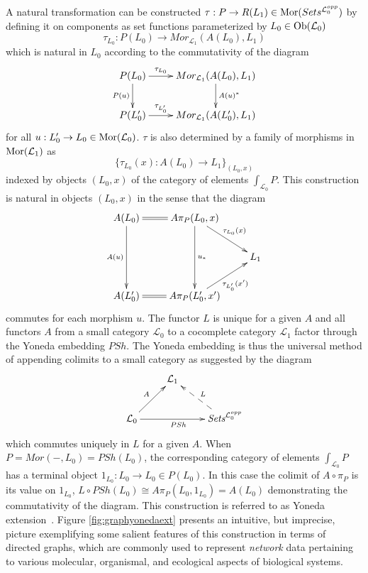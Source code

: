 \documentclass[aps,twocolumn]{revtex4-1}
\begin{document}
\iftoggle{thmsty}{
\begin{proof}
\label{proof-cocompletion-adjunction}
}{}
A natural transformation can be constructed $\tau : P \rightarrow R(L_1) \in \mathop{\rm Mor}\nolimits(Sets^{\mathcal{L}_0^{opp}})$ by defining it on components as set functions parameterized by $L_0 \in \mathop{\rm Ob}\nolimits(\mathcal{L}_0)$
$$
\tau_{L_0} : P(L_0) \rightarrow Mor_{\mathcal{L}_1}(A(L_0),L_1)
$$
which is natural in $L_0$ according to the commutativity of the diagram
$$
\xymatrix{
P(L_0) \ar[r]^-{\tau_{L_0}} \ar[d]_{P(u)} & Mor_{\mathcal{L}_1}(A(L_0),L_1) \ar[d]^{A(u)^*} \\
P(L'_0) \ar[r]^-{\tau_{L'_0}} & Mor_{\mathcal{L}_1}(A(L'_0),L_1) }
$$
for all $u:L'_0 \rightarrow L_0 \in \mathop{\rm Mor}\nolimits(\mathcal{L}_0)$. $\tau$ is also determined by a family of morphisms in $\mathop{\rm Mor}\nolimits(\mathcal{L}_1)$ as
$$
\{ \tau_{L_0}(x):A(L_0) \rightarrow L_1 \}_{(L_0,x)}
$$
indexed by objects $(L_0,x)$ of the category of elements $\int_{\mathcal{L}_0} P$. This construction is natural in objects $(L_0,x)$ in the sense that the diagram
$$
\xymatrix{
A(L_0) \ar@{=}[r] \ar[dd]_{A(u)} & A\pi_P(L_0,x) \ar[rd]^{\tau_{L_0}(x)} \ar[dd]^{u_*} & \\
& & L_1 \\
A(L'_0) \ar@{=}[r] & A\pi_P(L'_0,x') \ar[ru]_{\tau_{L'_0}(x')} &
}
$$
commutes for each morphism $u$.
The functor $L$ is unique for a given $A$ and all functors $A$ from a small category $\mathcal{L}_0$ to a cocomplete category $\mathcal{L}_1$ factor through the Yoneda embedding $PSh$. The Yoneda embedding is thus the universal method of appending colimits to a small category as suggested by the diagram
$$
\xymatrix{
& \mathcal{L}_1 & \\
\mathcal{L}_0 \ar[ru]^{A} \ar[rr]_{PSh} & & \textit{Sets}^{\mathcal{L}_0^{opp}} \ar@{-->}[lu]_{L}
}
$$
which commutes uniquely in $L$ for a given $A$. When $P = Mor(-,L_0) = PSh(L_0)$, the corresponding category of elements $\int_{\mathcal{L}_0} P$ has a terminal object $1_{L_0} : L_0 \rightarrow L_0 \in P(L_0)$. In this case the colimit of $A \circ \pi_P$ is its value on $1_{L_0}$, $L \circ PSh(L_0) \cong A \pi_P (L_0,1_{L_0}) = A(L_0)$ demonstrating the commutativity of the diagram. This construction is referred to as Yoneda extension~\cite{Lane1998,MacLane1992}. Figure \ref{fig:graphyonedaext} presents an intuitive, but imprecise, picture exemplifying some salient features of this construction in terms of directed graphs, which are commonly used to represent {\it network} data pertaining to various molecular, organismal, and ecological aspects of biological systems.
\end{document}
